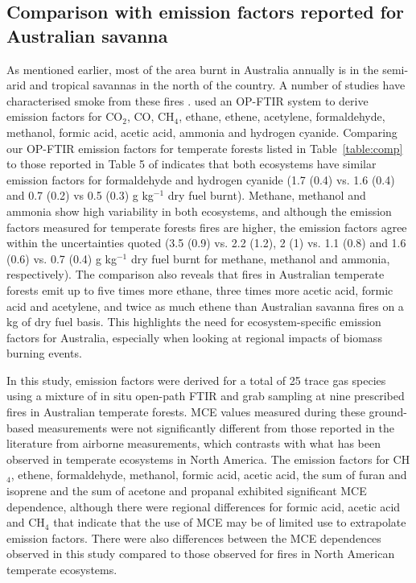 \documentclass[acp, manuscript]{copernicus}
\begin{document}
\subsection{Comparison with emission factors reported for Australian savanna}
As mentioned earlier, most of the area burnt in Australia annually is in the semi-arid and tropical savannas in the north of the country. A number of studies have characterised smoke from these fires \citep{Hurst1994a, Hurst1994,Hurst1996,Shirai2003,Paton-Walsh2010,Meyer2012,Smith2014, Desservettaz2017,  Wang2017b, Wang2017}. \citet{Smith2014} used an OP-FTIR system to derive emission factors for CO$_2$, CO, CH$_4$, ethane, ethene, acetylene, formaldehyde, methanol, formic acid, acetic acid, ammonia and hydrogen cyanide. Comparing our OP-FTIR emission factors for temperate forests listed in Table~\ref{table:comp} to those reported in Table 5 of \citet{Smith2014} indicates that both ecosystems have similar emission factors for formaldehyde and hydrogen cyanide (1.7 (0.4) vs. 1.6 (0.4) and 0.7 (0.2) vs 0.5 (0.3) g kg$^{-1}$ dry fuel burnt). Methane, methanol and ammonia show high variability in both ecosystems, and although the emission factors measured for temperate forests fires are higher, the emission factors agree within the uncertainties quoted (3.5 (0.9) vs. 2.2 (1.2),  2 (1) vs. 1.1 (0.8) and 1.6 (0.6) vs. 0.7 (0.4) g kg$^{-1}$ dry fuel burnt for methane, methanol and ammonia, respectively). The comparison also reveals that fires in Australian temperate forests emit up to five times more ethane, three times more acetic acid, formic acid and acetylene, and twice as much ethene than Australian savanna fires on a kg of dry fuel basis. This highlights the need for ecosystem-specific emission factors for Australia, especially when looking at regional impacts of biomass burning events. 

In this study, emission factors were derived for a total of 25 trace gas species using a mixture of in situ open-path FTIR and grab sampling at nine prescribed fires in Australian temperate forests. MCE values measured during these ground-based measurements were not significantly different from those reported in the literature from airborne measurements, which contrasts with what has been observed in temperate ecosystems in North America. The emission factors for CH$_4$, ethene, formaldehyde, methanol, formic acid, acetic acid, the sum of furan and isoprene and the sum of acetone and propanal exhibited significant MCE dependence, although there were regional differences for formic acid, acetic acid and CH$_4$ that indicate that the use of MCE may be of limited use to extrapolate emission factors. There were also differences between the MCE dependences observed in this study compared to those observed for fires in North American temperate ecosystems. 
\end{document}
